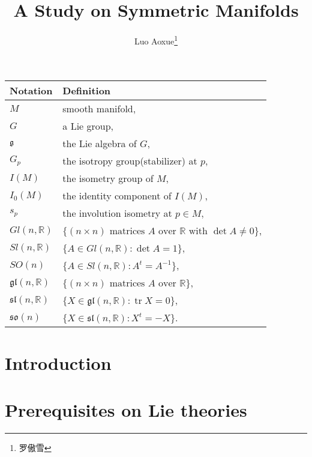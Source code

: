 \documentclass[twoside]{article}
\begin{document}
\title{A Study on Symmetric Manifolds}
\author{Luo Aoxue\footnote{罗傲雪}}

\begin{abstract}

\end{abstract}

\begin{center}
  \begin{tabular}{ll}
    \hline
    \textbf{Notation}              & \textbf{Definition} \\
    \hline
    $M$                            & smooth manifold,\\
    $G$                            & a Lie group,\\
    ${\mathfrak g}$                         & the Lie algebra of $G$,\\
    $G_p$                          & the isotropy group(stabilizer) at $p$,\\
    $I(M)$                         & the isometry group of $M$,\\
    $I_0(M)$                       & the identity component of $I(M)$,\\
    $s_p$                          & the involution isometry at $p\in M$,\\
    $Gl(n,\mathbb{R})$             & $\{(n\times n) \text{ matrices } A \text{ over } \mathbb{R} \text{ with } \det A\neq 0\}$,\\
    $Sl(n,\mathbb{R})$             & $\{A \in Gl(n,\mathbb{R}) : \det A =1\}$,\\
    $SO(n)$                        & $\{A \in Sl(n,\mathbb{R}) : A^t=A^{-1}\}$,\\
    $\mathfrak {gl}(n,\mathbb{R})$ & $\{(n\times n) \text{ matrices } A \text{ over } \mathbb{R}\}$,\\
    $\mathfrak{sl}(n,\mathbb{R})$  & $\{X \in \mathfrak {gl}(n,\mathbb{R}) : \operatorname{tr} X=0\}$,\\
    $\mathfrak{so}(n)$             & $\{X \in \mathfrak {sl}(n,\mathbb{R}) : X^t=-X\}$. \\
    \hline
  \end{tabular}
\end{center}

\section{Introduction}



\section{Prerequisites on Lie theories}
\end{document}
